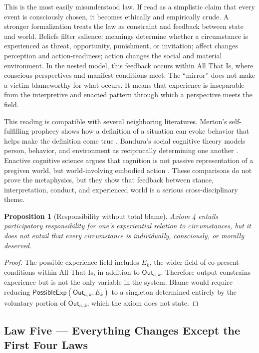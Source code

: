 \documentclass[11pt]{article}
\newtheorem{proposition}{Proposition}
\newcommand{\Out}{\mathsf{Out}}
\newcommand{\PossExp}{\mathsf{PossibleExp}}
\begin{document}
This is the most easily misunderstood law.  If read as a simplistic claim that every event is consciously chosen, it becomes ethically and empirically crude.  A stronger formalization treats the law as constraint and feedback between state and world.  Beliefs filter salience; meanings determine whether a circumstance is experienced as threat, opportunity, punishment, or invitation; affect changes perception and action-readiness; action changes the social and material environment.  In the nested model, this feedback occurs within All That Is, where conscious perspectives and manifest conditions meet.  The ``mirror'' does not make a victim blameworthy for what occurs.  It means that experience is inseparable from the interpretive and enacted pattern through which a perspective meets the field.

This reading is compatible with several neighboring literatures.  Merton's self-fulfilling prophecy shows how a definition of a situation can evoke behavior that helps make the definition come true \cite{Merton1948}.  Bandura's social cognitive theory models person, behavior, and environment as reciprocally determining one another \cite{Bandura1986}.  Enactive cognitive science argues that cognition is not passive representation of a pregiven world, but world-involving embodied action \cite{Varela1991}.  These comparisons do not prove the metaphysics, but they show that feedback between stance, interpretation, conduct, and experienced world is a serious cross-disciplinary theme.

\begin{proposition}[Responsibility without total blame]
Axiom 4 entails participatory responsibility for one's experiential relation to circumstances, but it does not entail that every circumstance is individually, consciously, or morally deserved.
\end{proposition}

\begin{proof}
The possible-experience field includes $E_k$, the wider field of co-present conditions within All That Is, in addition to $\Out_{a,k}$.  Therefore output constrains experience but is not the only variable in the system.  Blame would require reducing $\PossExp(\Out_{a,k},E_k)$ to a singleton determined entirely by the voluntary portion of $\Out_{a,k}$, which the axiom does not state.
\end{proof}

\subsection{Law Five --- Everything Changes Except the First Four Laws}
\end{document}
